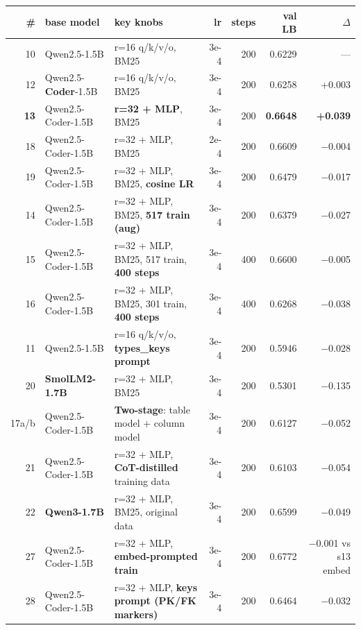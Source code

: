 \documentclass[10pt]{article}
\begin{document}
\begin{table}[t]
\centering\small
\setlength\tabcolsep{4pt}
\begin{tabular}{rllrrrr}
\toprule
\# & base model & key knobs & lr & steps & val LB & $\Delta$ \\
\midrule
10 & Qwen2.5-1.5B          & r=16 q/k/v/o, BM25                                & 3e-4 & 200 & 0.6229 & --- \\
12 & Qwen2.5-\textbf{Coder}-1.5B & r=16 q/k/v/o, BM25                          & 3e-4 & 200 & 0.6258 & +0.003 \\
\textbf{13} & Qwen2.5-Coder-1.5B & \textbf{r=32 + MLP}, BM25                   & 3e-4 & 200 & \textbf{0.6648} & \textbf{+0.039} \\
18 & Qwen2.5-Coder-1.5B    & r=32 + MLP, BM25                                  & 2e-4 & 200 & 0.6609 & $-$0.004 \\
19 & Qwen2.5-Coder-1.5B    & r=32 + MLP, BM25, \textbf{cosine LR}              & 3e-4 & 200 & 0.6479 & $-$0.017 \\
14 & Qwen2.5-Coder-1.5B    & r=32 + MLP, BM25, \textbf{517 train (aug)}        & 3e-4 & 200 & 0.6379 & $-$0.027 \\
15 & Qwen2.5-Coder-1.5B    & r=32 + MLP, BM25, 517 train, \textbf{400 steps}   & 3e-4 & 400 & 0.6600 & $-$0.005 \\
16 & Qwen2.5-Coder-1.5B    & r=32 + MLP, BM25, 301 train, \textbf{400 steps}   & 3e-4 & 400 & 0.6268 & $-$0.038 \\
11 & Qwen2.5-1.5B          & r=16 q/k/v/o, \textbf{types\_keys prompt}         & 3e-4 & 200 & 0.5946 & $-$0.028 \\
20 & \textbf{SmolLM2-1.7B} & r=32 + MLP, BM25                                  & 3e-4 & 200 & 0.5301 & $-$0.135 \\
17a/b & Qwen2.5-Coder-1.5B & \textbf{Two-stage}: table model + column model    & 3e-4 & 200 & 0.6127 & $-$0.052 \\
21 & Qwen2.5-Coder-1.5B    & r=32 + MLP, \textbf{CoT-distilled} training data  & 3e-4 & 200 & 0.6103 & $-$0.054 \\
22 & \textbf{Qwen3-1.7B}   & r=32 + MLP, BM25, original data                   & 3e-4 & 200 & 0.6599 & $-$0.049 \\
27 & Qwen2.5-Coder-1.5B    & r=32 + MLP, \textbf{embed-prompted train}         & 3e-4 & 200 & 0.6772 & $-$0.001 vs s13 embed \\
28 & Qwen2.5-Coder-1.5B    & r=32 + MLP, \textbf{keys prompt (PK/FK markers)}  & 3e-4 & 200 & 0.6464 & $-$0.032 \\

\end{tabular}
\end{table}
\end{document}
